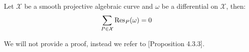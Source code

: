 \begin{theorem}\label{thm:res}
  Let $\mathcal{X}$ be a smooth projective algebraic curve and $\omega$ be a differential on $\mathcal{X}$, then:
  \begin{equation*}
    \sum_{P \in \mathcal{X}} \textnormal{Res}_{P}(\omega) = 0
  \end{equation*}
\end{theorem}
We will not provide a proof, instead we refer to \cite{aff_and_codes}[Proposition 4.3.3].
